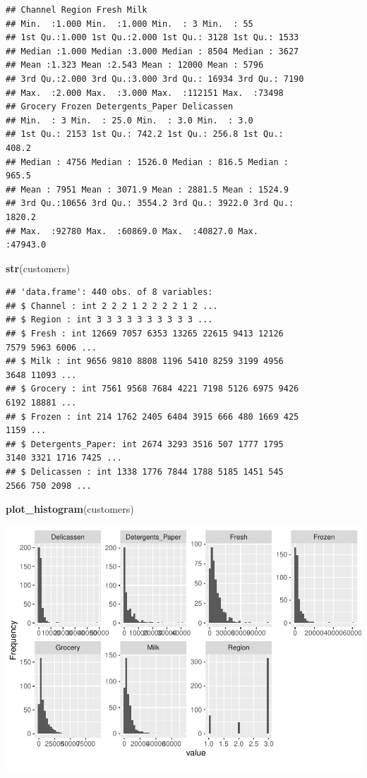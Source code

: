 \documentclass[
  english,
  man]{apa6}
\newenvironment{Shaded}{\begin{snugshade}}{\end{snugshade}}
\newcommand{\KeywordTok}[1]{\textcolor[rgb]{0.13,0.29,0.53}{\textbf{#1}}}
\newcommand{\NormalTok}[1]{#1}
\begin{document}
\begin{verbatim}
## Channel Region Fresh Milk
## Min.  :1.000 Min.  :1.000 Min.  : 3 Min.  : 55
## 1st Qu.:1.000 1st Qu.:2.000 1st Qu.: 3128 1st Qu.: 1533
## Median :1.000 Median :3.000 Median : 8504 Median : 3627
## Mean :1.323 Mean :2.543 Mean : 12000 Mean : 5796
## 3rd Qu.:2.000 3rd Qu.:3.000 3rd Qu.: 16934 3rd Qu.: 7190
## Max.  :2.000 Max.  :3.000 Max.  :112151 Max.  :73498
## Grocery Frozen Detergents_Paper Delicassen
## Min.  : 3 Min.  : 25.0 Min.  : 3.0 Min.  : 3.0
## 1st Qu.: 2153 1st Qu.: 742.2 1st Qu.: 256.8 1st Qu.:
408.2
## Median : 4756 Median : 1526.0 Median : 816.5 Median :
965.5
## Mean : 7951 Mean : 3071.9 Mean : 2881.5 Mean : 1524.9
## 3rd Qu.:10656 3rd Qu.: 3554.2 3rd Qu.: 3922.0 3rd Qu.:
1820.2
## Max.  :92780 Max.  :60869.0 Max.  :40827.0 Max.
:47943.0
\end{verbatim}

\begin{Shaded}
\begin{Highlighting}[]
\KeywordTok{str}\NormalTok{(customers)}
\end{Highlighting}
\end{Shaded}

\begin{verbatim}
## 'data.frame': 440 obs. of 8 variables:
## $ Channel : int 2 2 2 1 2 2 2 2 1 2 ...
## $ Region : int 3 3 3 3 3 3 3 3 3 3 ...
## $ Fresh : int 12669 7057 6353 13265 22615 9413 12126
7579 5963 6006 ...
## $ Milk : int 9656 9810 8808 1196 5410 8259 3199 4956
3648 11093 ...
## $ Grocery : int 7561 9568 7684 4221 7198 5126 6975 9426
6192 18881 ...
## $ Frozen : int 214 1762 2405 6404 3915 666 480 1669 425
1159 ...
## $ Detergents_Paper: int 2674 3293 3516 507 1777 1795
3140 3321 1716 7425 ...
## $ Delicassen : int 1338 1776 7844 1788 5185 1451 545
2566 750 2098 ...
\end{verbatim}

\begin{Shaded}
\begin{Highlighting}[]
\KeywordTok{plot_histogram}\NormalTok{(customers)}
\end{Highlighting}
\end{Shaded}

\includegraphics{MSDS680-Week-6-Kmeans-and-HCA_files/figure-latex/data clean-1.pdf}
\end{document}
